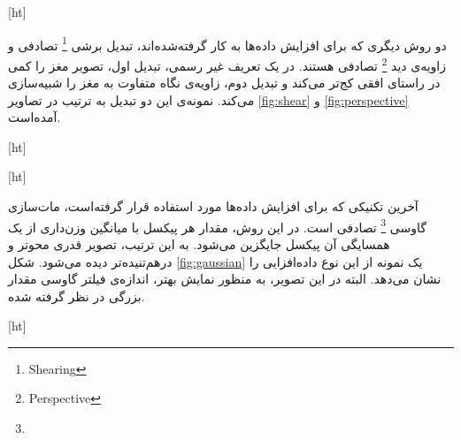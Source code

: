 [ht]

دو روش دیگری که برای افزایش داده‌ها به کار گرفته‌شده‌اند، تبدیل برشی
\footnote{Shearing}
تصادفی و زاویه‌ی دید
\footnote{Perspective}
تصادفی هستند.
در یک تعریف غیر رسمی، تبدیل اول، تصویر مغز را کمی در راستای افقی کج‌تر می‌کند و تبدیل دوم، زاویه‌ی نگاه متفاوت به مغز را شبیه‌سازی می‌کند.
نمونه‌ی این دو تبدیل به ترتیب در تصاویر \ref{fig:shear} و \ref{fig:perspective} آمده‌است.


[ht]



[ht]

آخرین تکنیکی که برای افزایش داده‌ها مورد استفاده قرار گرفته‌است، 
مات‌سازی گاوسی
\footnote{}
تصادفی است.
در این روش، مقدار هر پیکسل با میانگین وزن‌داری از یک همسایگی آن پیکسل جایگزین می‌شود.
به این ترتیب، تصویر قدری محو‌تر و درهم‌تنیده‌تر دیده می‌شود.
شکل \ref{fig:gaussian} یک نمونه از این نوع داده‌افزایی را نشان می‌دهد.
البته در این تصویر، به منظور نمایش بهتر، اندازه‌ی فیلتر گاوسی مقدار بزرگی در نظر گرفته شده.


[ht]

